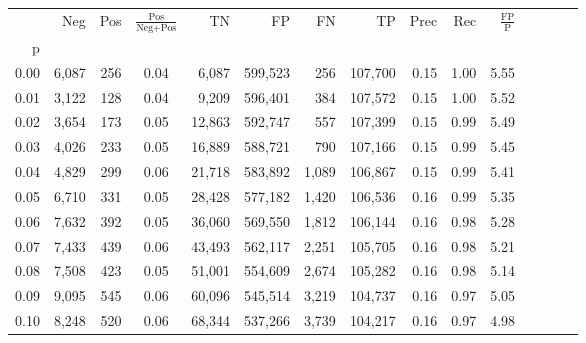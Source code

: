 \begin{tabular}{rrrcrrrrrrrrrrr}
\toprule
{} &     Neg &    Pos & $\frac{\text{Pos}}{\text{Neg}+\text{Pos}}$ &       TN &       FP &       FN &       TP &  Prec &   Rec & $\frac{\text{FP}}{\text{P}}$ \\
p    &         &        &                                            &          &          &          &          &       &       &                              \\
\midrule
0.00 &   6,087 &    256 &                                       0.04 &    6,087 &  599,523 &      256 &  107,700 &  0.15 &  1.00 &                         5.55 \\
0.01 &   3,122 &    128 &                                       0.04 &    9,209 &  596,401 &      384 &  107,572 &  0.15 &  1.00 &                         5.52 \\
0.02 &   3,654 &    173 &                                       0.05 &   12,863 &  592,747 &      557 &  107,399 &  0.15 &  0.99 &                         5.49 \\
0.03 &   4,026 &    233 &                                       0.05 &   16,889 &  588,721 &      790 &  107,166 &  0.15 &  0.99 &                         5.45 \\
0.04 &   4,829 &    299 &                                       0.06 &   21,718 &  583,892 &    1,089 &  106,867 &  0.15 &  0.99 &                         5.41 \\
0.05 &   6,710 &    331 &                                       0.05 &   28,428 &  577,182 &    1,420 &  106,536 &  0.16 &  0.99 &                         5.35 \\
0.06 &   7,632 &    392 &                                       0.05 &   36,060 &  569,550 &    1,812 &  106,144 &  0.16 &  0.98 &                         5.28 \\
0.07 &   7,433 &    439 &                                       0.06 &   43,493 &  562,117 &    2,251 &  105,705 &  0.16 &  0.98 &                         5.21 \\
0.08 &   7,508 &    423 &                                       0.05 &   51,001 &  554,609 &    2,674 &  105,282 &  0.16 &  0.98 &                         5.14 \\
0.09 &   9,095 &    545 &                                       0.06 &   60,096 &  545,514 &    3,219 &  104,737 &  0.16 &  0.97 &                         5.05 \\
0.10 &   8,248 &    520 &                                       0.06 &   68,344 &  537,266 &    3,739 &  104,217 &  0.16 &  0.97 &                         4.98 \\

\end{tabular}
